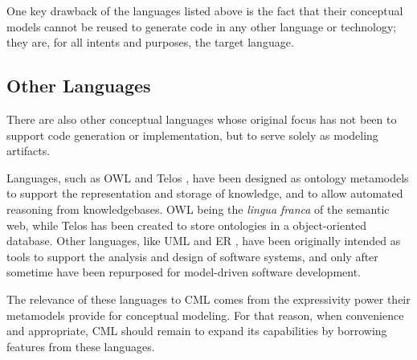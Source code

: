One key drawback of the languages listed above is the fact that their conceptual models
cannot be reused to generate code in any other language or technology;
they are, for all intents and purposes, the target language.

\subsection{Other Languages}

There are also other conceptual languages whose original focus has not been to support code generation or implementation,
but to serve solely as modeling artifacts.

Languages, such as OWL \cite{owl2} and Telos \cite{telos}, have been designed as ontology metamodels
to support the representation and storage of knowledge,
and to allow automated reasoning from knowledgebases.
OWL being the \emph{lingua franca} of the semantic web,
while Telos has been created to store ontologies in a object-oriented database.
Other languages, like UML \cite{uml} and ER \cite{er}, have been originally intended as tools to support the analysis and design of software systems, and only after sometime have been repurposed for model-driven software development.

The relevance of these languages to CML comes from the expressivity power their metamodels provide for conceptual modeling. For that reason, when convenience and appropriate, CML should remain to expand its capabilities by borrowing features from these languages.
